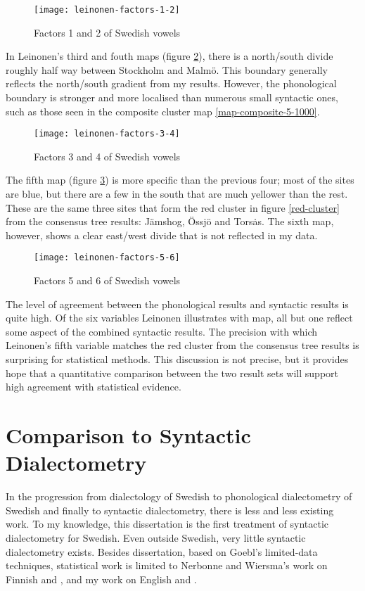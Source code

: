 \begin{figure}
  \texttt{[image: leinonen-factors-1-2]}
  \caption{Factors 1 and 2 of Swedish vowels}
  \label{leinonen-factors-1-2}
\end{figure}

In Leinonen's third and fouth maps (figure \ref{leinonen-factors-3-4}),
there is a north/south divide roughly half way between Stockholm and
Malm\"o. This boundary generally reflects the north/south
gradient from my results. However, the phonological boundary is stronger and more
localised than numerous small syntactic ones, such as those seen in
the composite cluster map \ref{map-composite-5-1000}.

\begin{figure}
  \texttt{[image: leinonen-factors-3-4]}
  \caption{Factors 3 and 4 of Swedish vowels}
  \label{leinonen-factors-3-4}
\end{figure}


The fifth map (figure \ref{leinonen-factors-5-6}) is more specific
than the previous four; most of the sites are blue, but there are a
few in the south that are much yellower than the rest. These are the
same three sites that form the red cluster in
figure \ref{red-cluster} from the consensus tree
results: J\"amshog, \"Ossj\"o and Tors\.as. The sixth map, however,
shows a clear east/west divide that is not reflected in my data.

\begin{figure}
  \texttt{[image: leinonen-factors-5-6]}
  \caption{Factors 5 and 6 of Swedish vowels}
  \label{leinonen-factors-5-6}
\end{figure}

The level of agreement between the phonological results and syntactic
results is quite high. Of the six variables Leinonen illustrates with
map, all but one reflect some aspect of the combined syntactic
results. The precision with which Leinonen's fifth variable matches
the red cluster from the consensus tree results is surprising for
statistical methods. This discussion is not precise, but it provides
hope that a quantitative comparison between the two result sets will
support high agreement with statistical evidence.

\section{Comparison to Syntactic Dialectometry}

In the progression from dialectology of Swedish to phonological
dialectometry of Swedish and finally to syntactic dialectometry, there
is less and less existing work. To my knowledge, this dissertation is
the first treatment of syntactic dialectometry for Swedish. Even
outside Swedish, very little syntactic dialectometry exists. Besides
 dissertation, based on Goebl's limited-data
techniques, statistical work is limited to Nerbonne and Wiersma's work
on Finnish \cite{nerbonne06} and \cite{wiersma09}, and my work on
English \cite{sanders07} and \cite{sanders08b}.

